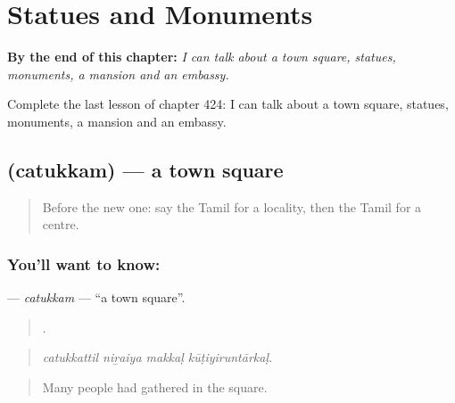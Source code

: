 
\chapter{Statues and Monuments}
\label{ch:ta-statues-and-monuments}

\begin{chapteropening}
\textbf{By the end of this chapter:} \emph{I can talk about a town square, statues, monuments, a mansion and an embassy.}

Complete the last lesson of chapter 424: I can talk about a town square, statues, monuments, a mansion and an embassy.
\end{chapteropening}

\section[\texorpdfstring{\ta{சதுக்கம்} (catukkam)}{சதுக்கம் (catukkam)}]{ (catukkam) — a town square}

\label{lesson:TA-C424-catukkam}



\begin{quote}
Before the new one: say the Tamil for a locality, then the Tamil for a centre.
\end{quote}

\subsection*{You'll want to know: }
\textbf{} — \emph{catukkam} — \textquotedblleft{}a town square\textquotedblright{}.

\begin{quote}
   .
\end{quote}

\begin{quote}
\emph{catukkattil niṟaiya makkaḷ kūṭiyiruntārkaḷ.}
\end{quote}

\begin{quote}
Many people had gathered in the square.
\end{quote}

